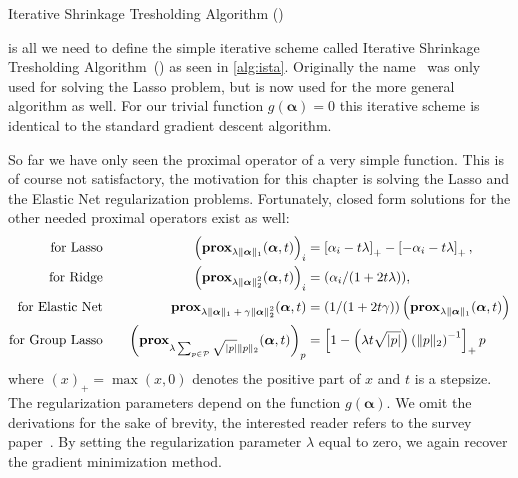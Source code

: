 \begin{algorithm}
 \caption{Iterative Shrinkage Tresholding Algorithm (\ista)~\cite{fista}}\label{alg:ista} 
 \begin{algorithmic}[1]
    \Statex
     
      \EndWhile
     \State \Return{\(\bm{\alpha}\)}
    \EndFunction
\end{algorithmic}
\end{algorithm}

 is all we need to define the simple iterative scheme called
Iterative Shrinkage Tresholding Algorithm~(\ista) as seen in \cref{alg:ista}.
Originally the name \ista\ was only used for solving the Lasso problem, but is now used for the more general algorithm as well. 
For our trivial function \(g(\bm{\alpha}) = 0\) this iterative scheme is identical to the standard gradient descent algorithm.

So far we have only seen the proximal operator of a very simple function.
This is of course not satisfactory, the motivation for this chapter is solving the Lasso and the Elastic Net regularization problems.
Fortunately, closed form solutions for the other needed proximal operators exist as well:
\begin{align}
\label{eq:prox-lasso}
\text{for Lasso} \quad &&
    \left( \prox[\(\lambda \Vert \bm{\alpha} \Vert_1\)]{\bm{\alpha}}{t} \right)_i &= \left[\alpha_i - t \lambda \right]_+
    - \left[ -\alpha_i - t \lambda \right]_+, \\
\text{for Ridge} \quad &&
                          \left(  \prox[\( \lambda \Vert \bm{\alpha} \Vert_2^2\)]{\bm{\alpha}}{t} \right)_i &= (\alpha_i/(1 + 2t \lambda)), \nonumber\\
  \text{for Elastic Net} \quad && \prox[\( \lambda \Vert \bm{\alpha} \Vert_1 + \gamma \Vert \bm{\alpha} \Vert_2^2\)]{\bm{\alpha}}{t} &=
                                                                                                                                       \left( 1/(1 + 2 t \gamma) \right) \left(\prox[\(\lambda \Vert \bm{\alpha} \Vert_1\)]{\bm{\alpha}}{t}\right) \nonumber\\
  \text{for Group Lasso} \quad && {\left(\prox[\( \lambda \sum_{p \in \mathcal{P}} \sqrt{\vert p \vert} \Vert p \Vert_2 \)]{\bm{\alpha}}{t} \right)}_p &=
                                                                                     \left[ 1 - \left(\lambda t \sqrt{\vert p \vert}\right) \left( \Vert p \Vert_2 \right)^{-1} \right]_+ p \nonumber
\end{align}
where \( \left( x \right)_+ = \max(x, 0) \) denotes the positive part of \(x\)
and \(t\) is a stepsize.
The regularization parameters depend on the function \(g(\bm{\alpha})\).
We omit the derivations for the sake of brevity, the interested reader refers to the survey paper~\cite{proxsurvey}.
By setting the regularization parameter \(\lambda\) equal to zero, we again recover the gradient minimization method.

